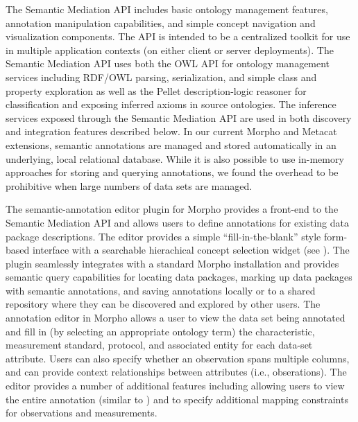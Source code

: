  The Semantic Mediation API
includes basic ontology management features, annotation manipulation
capabilities, and simple concept navigation and visualization
components. The API is intended to be a centralized toolkit for use in
multiple application contexts (on either client or server deployments).
The Semantic Mediation API uses both the OWL API \cite{owlapi} for ontology
management services including RDF/OWL parsing, serialization, and
simple class and property exploration as well as the Pellet
description-logic reasoner \cite{pellet} for classification and exposing
inferred axioms in source ontologies. The inference services exposed
through the Semantic Mediation API are used in both discovery and
integration features described below.
In our current Morpho and Metacat extensions, semantic annotations are
managed and stored automatically in an underlying, local relational
database. While it is also possible to use in-memory approaches for
storing and querying annotations, we found the overhead to be
prohibitive when large numbers of data sets are managed.




  The semantic-annotation editor
plugin for Morpho provides a front-end to the Semantic Mediation API
and allows users to define annotations for existing data package
descriptions. The editor provides a simple ``fill-in-the-blank'' style
form-based interface with a searchable hierachical concept selection
widget (see ). The plugin seamlessly
integrates with a standard Morpho installation and provides semantic
query capabilities for locating data packages, marking up data
packages with semantic annotations, and saving annotations locally or
to a shared repository where they can be discovered and explored by
other users. The annotation editor in Morpho allows a user to view the
data set being annotated and fill in (by selecting an appropriate
ontology term) the characteristic, measurement standard, protocol, and
associated entity for each data-set attribute. Users can also specify
whether an observation spans multiple columns, and can provide context
relationships between attributes (i.e., obserations). The editor
provides a number of additional features including allowing users to
view the entire annotation (similar to )
and to specify additional mapping constraints for observations and
measurements.

